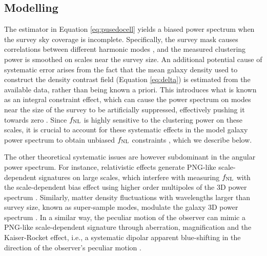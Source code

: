 \subsection{Modelling}
The estimator in Equation \ref{eq:pusedocell} yields a biased power spectrum when the survey sky coverage is incomplete. Specifically, the survey mask causes correlations between different harmonic modes \citep{beutler2014clustering,wilson2017rapid}, and the measured clustering power is smoothed on scales near the survey size. An additional potential cause of systematic error arises from the fact that the mean galaxy density used to construct the density contrast field (Equation \ref{eq:delta}) is estimated from the available data, rather than being known a priori. This introduces what is known as an integral constraint effect, which can cause the power spectrum on modes near the size of the survey to be artificially suppressed, effectively pushing it towards zero \citep{peacock1991large,de2019integral}. Since $f_{\rm NL}$ is highly sensitive to the clustering power on these scales, it is crucial to account for these systematic effects in the model galaxy power spectrum to obtain unbiased $f_{\rm NL}$ constraints \citep[see, also,][]{riquelme2022primordial}, which we describe below.
  
The other theoretical systematic issues are however subdominant in the angular power spectrum. For instance, relativistic effects generate PNG-like scale-dependent signatures on large scales, which interfere with measuring $f_{\rm NL}$ with the scale-dependent bias effect using higher order multipoles of the 3D power spectrum \citep{wang2020}. Similarly, matter density fluctuations with wavelengths larger than survey size, known as super-sample modes, modulate the galaxy 3D power spectrum \citep{castorina2020JCAP}. In a similar way, the peculiar motion of the observer can mimic a PNG-like scale-dependent signature through aberration, magnification and the Kaiser-Rocket effect, i.e., a systematic dipolar apparent blue-shifting in the direction of the observer's peculiar motion \citep{2021JCAP...11..027B}.
  
